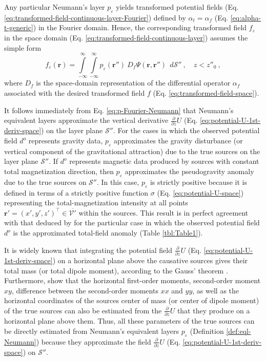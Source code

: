 Any particular Neumann's layer $p_{\varepsilon}$ yields transformed potential 
fields (Eq. \ref{eq:transformed-field-continuous-layer-Fourier}) 
defined by $\alpha_{t} = \alpha_{f}$ (Eq. \ref{eq:alpha-t-generic}) in the Fourier domain. 
Hence, the corresponding transformed field $f_{\varepsilon}$ in the space domain 
(Eq. \ref{eq:transformed-field-continuous-layer}) assumes the simple form
\begin{equation}
	f_{\varepsilon}(\mathbf{r})
	= \int\limits_{-\infty}^{\infty}\int\limits_{-\infty}^{\infty}
	p_{\varepsilon}(\mathbf{r}'') \: D_{f} \Psi(\mathbf{r}, \mathbf{r}'') \:\: d\mathcal{S}''
	\: , \quad z < z''_{0} \: ,
	\label{eq:transformed-field-continuous-layer-Neumann}
\end{equation}
where $D_{f}$ is the space-domain representation of the differential operator $\alpha_{f}$ 
associated with the desired transformed field $f$ (Eq. \ref{eq:transformed-field-space}).

It follows immediately from Eq. \ref{eq:p-Fourier-Neumann} that Neumann's equivalent layers approximate 
the vertical derivative $\tfrac{\partial}{\partial z} U$ (Eq. \ref{eq:potential-U-1st-deriv-space}) 
on the layer plane $\mathcal{S}''$.
For the cases in which the observed potential field $d^{o}$ represents gravity data, 
$p_{\varepsilon}$ approximates the gravity disturbance (or vertical component of the gravitational
attraction) due to the true sources on the layer plane $\mathcal{S}''$.
If $d^{o}$ represents magnetic data produced by sources with constant total magnetization direction, 
then $p_{\varepsilon}$ approximates the pseudogravity 
anomaly \citep[][p. 345]{blakely1996} due to the true sources on $\mathcal{S}''$.
In this case, $p_{\varepsilon}$ is strictly positive because it is defined in terms of a strictly positive 
function $\sigma$ (Eq. \ref{eq:potential-U-space}) representing the 
total-magnetization intensity at all points 
$\mathbf{r}' = (x', y', z')^{\top} \in \overline{\mathcal{V}'}$ 
within the sources.
This result is in perfect agreement with that deduced by \cite{reis_etal2020} for
the particular case in which the observed potential field $d^{o}$ is
the approximated total-field anomaly (Table \ref{tbl:Table1}).

It is widely known that integrating the potential field $\tfrac{\partial}{\partial z} U$ 
(Eq. \ref{eq:potential-U-1st-deriv-space}) on a horizontal plane above the causative sources
gives their total mass (or total dipole moment), according to the
Gauss' theorem \citep[e.g.,][]{hammer1945, lafehr1965, bhattacharyya1967}. 
Furthermore, \cite{medeiros-silva1995a} show that the horizontal first-order moments, second-order moment $xy$, 
difference between the second-order moments $xx$ and $yy$, as well as the horizontal coordinates of the sources center of mass
(or center of dipole moment) of the true sources can also be estimated from the $\tfrac{\partial}{\partial z} U$
that they produce on a horizontal plane above them.
Thus, all these parameters of the true sources can be directly estimated from 
Neumann's equivalent layers $p_{\varepsilon}$ (Definition \ref{def:eql-Neumann}) because
they approximate the field $\tfrac{\partial}{\partial z} U$ (Eq. \ref{eq:potential-U-1st-deriv-space}) 
on $\mathcal{S}''$.